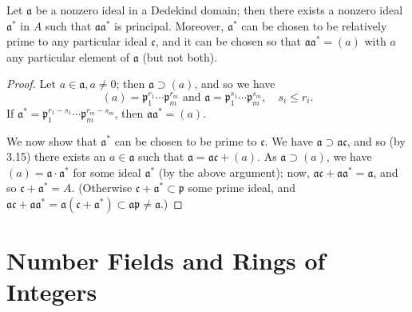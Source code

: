 \documentclass[12pt, oneside]{book}
\begin{document}
\begin{corollary}
    Let $\mathfrak{a}$ be a nonzero ideal in a Dedekind domain; then there exists a nonzero ideal $\mathfrak{a}^*$ in $A$ such that $\mathfrak{a} \mathfrak{a}^*$ is principal. Moreover, $\mathfrak{a}^*$ can be chosen to be relatively prime to any particular ideal $\mathfrak{c}$, and it can be chosen so that $\mathfrak{a} \mathfrak{a}^*=(a)$ with $a$ any particular element of $\mathfrak{a}$ (but not both).
    \begin{proof}
        Let $a \in \mathfrak{a}, a \neq 0$; then $\mathfrak{a} \supset(a)$, and so we have
        \begin{equation*}
            (a)=\mathfrak{p}_1^{r_1} \cdots \mathfrak{p}_m^{r_m} \text { and } \mathfrak{a}=\mathfrak{p}_1^{s_1} \cdots \mathfrak{p}_m^{s_m}, \quad s_i \leq r_i .
        \end{equation*}
        If $\mathfrak{a}^*=\mathfrak{p}_1^{r_1-s_1} \cdots \mathfrak{p}_m^{r_m-s_m}$, then $\mathfrak{a} \mathfrak{a}^*=(a)$.

        We now show that $\mathfrak{a}^*$ can be chosen to be prime to $\mathfrak{c}$.
        We have $\mathfrak{a} \supset \mathfrak{a} \mathfrak{c}$, and so (by 3.15) there exists an $a \in \mathfrak{a}$ such that $\mathfrak{a}=\mathfrak{a} \mathfrak{c}+(a)$. As $\mathfrak{a} \supset(a)$, we have $(a)=\mathfrak{a} \cdot \mathfrak{a}^*$ for some ideal $\mathfrak{a}^*$ (by the above argument); now, $\mathfrak{a} \mathfrak{c}+\mathfrak{a} \mathfrak{a}^*=\mathfrak{a}$, and so $\mathfrak{c}+\mathfrak{a}^*=A$. (Otherwise $\mathfrak{c}+\mathfrak{a}^* \subset \mathfrak{p}$ some prime ideal, and $\mathfrak{a c}+\mathfrak{a} \mathfrak{a}^*=\mathfrak{a}\left(\mathfrak{c}+\mathfrak{a}^*\right) \subset \mathfrak{a} \mathfrak{p} \neq \mathfrak{a}$.)
    \end{proof}
\end{corollary}




























\chapter{Number Fields and Rings of Integers}
\end{document}
